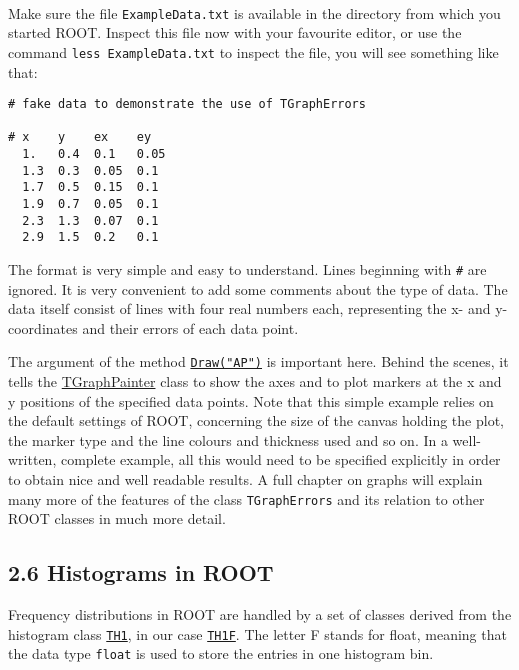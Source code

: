 \documentclass{article}
\begin{document}
    \begin{center}
    \end{center}
    { \hspace*{\fill} \\}
    
    Make sure the file \texttt{ExampleData.txt} is available in the
directory from which you started ROOT. Inspect this file now with your
favourite editor, or use the command \texttt{less\ ExampleData.txt} to
inspect the file, you will see something like that:

\begin{verbatim}
# fake data to demonstrate the use of TGraphErrors

# x    y    ex    ey
  1.   0.4  0.1   0.05
  1.3  0.3  0.05  0.1
  1.7  0.5  0.15  0.1
  1.9  0.7  0.05  0.1
  2.3  1.3  0.07  0.1
  2.9  1.5  0.2   0.1
\end{verbatim}

The format is very simple and easy to understand. Lines beginning with
\texttt{\#} are ignored. It is very convenient to add some comments
about the type of data. The data itself consist of lines with four real
numbers each, representing the x- and y- coordinates and their errors of
each data point.

The argument of the method
\href{https://root.cern.ch/doc/v606/classTObject.html\#adaa7be22dce34ebb73fbf22e4bdf33a2}{\texttt{Draw("AP")}}
is important here. Behind the scenes, it tells the
\href{https://root.cern.ch/doc/v606/classTHistPainter.html}{TGraphPainter}
class to show the axes and to plot markers at the x and y positions of
the specified data points. Note that this simple example relies on the
default settings of ROOT, concerning the size of the canvas holding the
plot, the marker type and the line colours and thickness used and so on.
In a well-written, complete example, all this would need to be specified
explicitly in order to obtain nice and well readable results. A full
chapter on graphs will explain many more of the features of the class
\texttt{TGraphErrors} and its relation to other ROOT classes in much
more detail.

\subsection{2.6 Histograms in ROOT}\label{histograms-in-root}

Frequency distributions in ROOT are handled by a set of classes derived
from the histogram class
\href{https://root.cern.ch/doc/master/classTH1.html}{\texttt{TH1}}, in
our case
\href{https://root.cern.ch/doc/master/classTH1F.html}{\texttt{TH1F}}.
The letter F stands for float, meaning that the data type \texttt{float}
is used to store the entries in one histogram bin.
\end{document}
